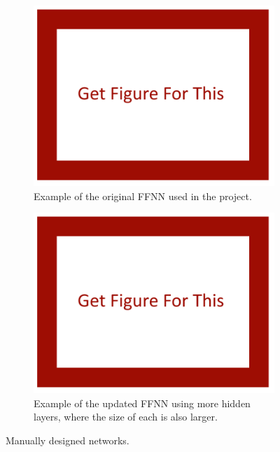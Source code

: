 \documentclass[11pt, a4paper]{article}
\begin{document}
\begin{figure}[H]
	\centering
	\begin{subfigure}[t]{0.45\linewidth}
		\includegraphics[width = \linewidth] {[ Figures ]/Get Figure.png}
		\caption{Example of the original FFNN used in the project.}
		\label{fig:ffnn_:_original_motor_imagery}
	\end{subfigure}
	\begin{subfigure}[t]{0.45\linewidth}
		\includegraphics[width = \linewidth] {[ Figures ]/Get Figure.png}
		\caption{Example of the updated FFNN using more hidden layers, where the size of each is also larger.}
		\label{fig:ffnn_:_200_node_layer_motor_imagery}
	\end{subfigure}
	\caption{Manually designed networks.}
	\label{fig:ffnn_:_networks}
\end{figure}
\end{document}
